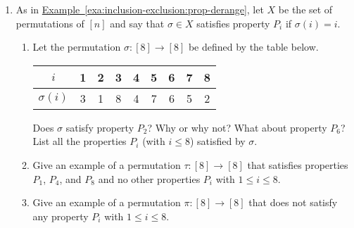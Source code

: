 \begin{enumerate}
\item As in
  \hyperref[exa:inclusion-exclusion:prop-derange]{Example~\ref*{exa:inclusion-exclusion:prop-derange}},
  let $X$ be the set of permutations of $[n]$ and say that $\sigma\in
  X$ satisfies property $P_i$ if $\sigma(i) = i$.
  \begin{enumerate}
  \item Let the permutation $\sigma\colon [8]\to [8]$ be defined by the table
    below.
    \begin{center}
      \begin{tabular}{c|c|c|c|c|c|c|c|c}
        $i$ & 1 & 2 & 3 & 4 & 5 & 6 & 7 & 8\\\hline
        $\sigma(i)$ & 3 & 1 & 8 & 4 & 7 & 6 & 5 & 2
      \end{tabular}
    \end{center}
    Does $\sigma$ satisfy property $P_2$? Why or why not? What about
    property $P_6$? List all the properties $P_i$ (with $i\leq 8$)
    satisfied by $\sigma$.
  \item Give an example of a permutation $\tau\colon[8]\to[8]$ that
    satisfies properties $P_1$, $P_4$, and $P_8$ and no other
    properties $P_i$ with $1\leq i\leq 8$.
  \item Give an example of a permutation $\pi\colon [8]\to[8]$ that
    does not satisfy any property $P_i$ with $1\leq i\leq 8$.
  \end{enumerate}


\end{enumerate}
